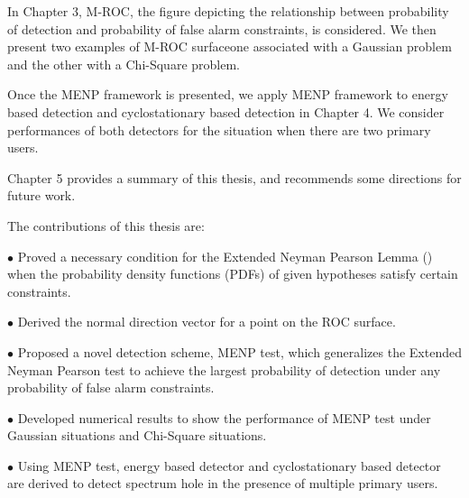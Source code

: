 In Chapter 3, M-ROC, the figure depicting the relationship between probability of detection and probability of false alarm constraints, is considered.  We then present two examples of M-ROC surfaceone associated with a Gaussian problem and the other with a Chi-Square problem. 

Once the MENP framework is presented, we apply MENP framework to energy based detection and cyclostationary based detection in Chapter 4. We consider  performances of both detectors for the situation when there are two primary users.  

Chapter 5 provides a summary of this thesis, and recommends some directions for future work.  

The contributions of this thesis are:

$\bullet$ Proved a necessary condition for the Extended Neyman Pearson Lemma () when the probability density functions (PDFs) of given hypotheses satisfy certain constraints. 

$\bullet$ Derived the normal direction vector for a point on the ROC surface. 

$\bullet$ Proposed a novel detection scheme, MENP test, which generalizes the Extended Neyman Pearson test to  achieve the largest probability of detection under any probability of false alarm constraints. 

$\bullet$ Developed numerical results to show the performance of MENP test under Gaussian situations and Chi-Square situations. 

$\bullet$ Using MENP test, energy based detector and cyclostationary based detector are derived to detect spectrum hole in the presence of multiple primary users. 
